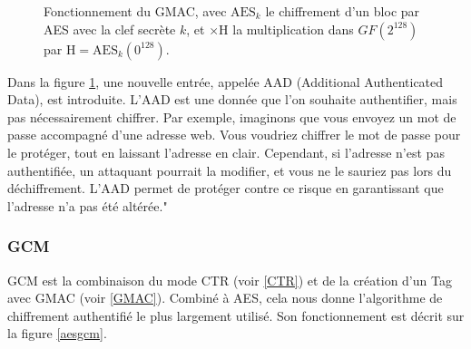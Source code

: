 \documentclass[a4paper, 12pt]{article}
\begin{document}
\begin{figure}[h]
\caption{Fonctionnement du GMAC, avec $\text{AES}_k$ le chiffrement d'un bloc par AES avec la clef secrète $k$, et $\times \text{H}$ la multiplication dans $GF\left(2^{128}\right)$ par $\text{H} = \text{AES}_k\left({0}^{128}\right)$.}
\label{gmac}
\end{figure}

Dans la figure \ref{gmac}, une nouvelle entrée, appelée AAD (Additional Authenticated Data), est introduite. L'AAD est une donnée que l'on souhaite authentifier, mais pas nécessairement chiffrer. Par exemple, imaginons que vous envoyez un mot de passe accompagné d'une adresse web. Vous voudriez chiffrer le mot de passe pour le protéger, tout en laissant l'adresse en clair. Cependant, si l'adresse n'est pas authentifiée, un attaquant pourrait la modifier, et vous ne le sauriez pas lors du déchiffrement. L'AAD permet de protéger contre ce risque en garantissant que l'adresse n'a pas été altérée."

\subsubsection{GCM}

GCM est la combinaison du mode CTR (voir \ref{CTR}) et de la création d'un Tag avec GMAC (voir \ref{GMAC}). Combiné à AES, cela nous donne l'algorithme de chiffrement authentifié le plus largement utilisé. Son fonctionnement est décrit sur la figure \ref{aesgcm}.
\end{document}

